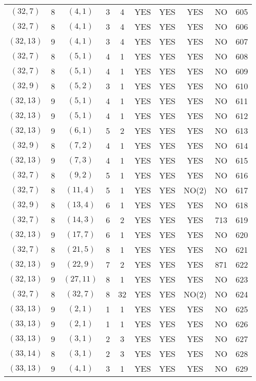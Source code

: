 \begin{longtable}{|c|c|c|c|c|c|c|c|c|c|}
$(32, 7)$ & 8 & $(4, 1)$ & 3 & 4 & YES & YES & YES & NO & 605\\
$(32, 7)$ & 8 & $(4, 1)$ & 3 & 4 & YES & YES & YES & NO & 606\\
$(32, 13)$ & 9 & $(4, 1)$ & 3 & 4 & YES & YES & YES & NO & 607\\
$(32, 7)$ & 8 & $(5, 1)$ & 4 & 1 & YES & YES & YES & NO & 608\\
$(32, 7)$ & 8 & $(5, 1)$ & 4 & 1 & YES & YES & YES & NO & 609\\
$(32, 9)$ & 8 & $(5, 2)$ & 3 & 1 & YES & YES & YES & NO & 610\\
$(32, 13)$ & 9 & $(5, 1)$ & 4 & 1 & YES & YES & YES & NO & 611\\
$(32, 13)$ & 9 & $(5, 1)$ & 4 & 1 & YES & YES & YES & NO & 612\\
$(32, 13)$ & 9 & $(6, 1)$ & 5 & 2 & YES & YES & YES & NO & 613\\
$(32, 9)$ & 8 & $(7, 2)$ & 4 & 1 & YES & YES & YES & NO & 614\\
$(32, 13)$ & 9 & $(7, 3)$ & 4 & 1 & YES & YES & YES & NO & 615\\
$(32, 7)$ & 8 & $(9, 2)$ & 5 & 1 & YES & YES & YES & NO & 616\\
$(32, 7)$ & 8 & $(11, 4)$ & 5 & 1 & YES & YES & NO(2) & NO & 617\\
$(32, 9)$ & 8 & $(13, 4)$ & 6 & 1 & YES & YES & YES & NO & 618\\
$(32, 7)$ & 8 & $(14, 3)$ & 6 & 2 & YES & YES & YES & 713 & 619\\
$(32, 13)$ & 9 & $(17, 7)$ & 6 & 1 & YES & YES & YES & NO & 620\\
$(32, 7)$ & 8 & $(21, 5)$ & 8 & 1 & YES & YES & YES & NO & 621\\
$(32, 13)$ & 9 & $(22, 9)$ & 7 & 2 & YES & YES & YES & 871 & 622\\
$(32, 13)$ & 9 & $(27, 11)$ & 8 & 1 & YES & YES & YES & NO & 623\\
$(32, 7)$ & 8 & $(32, 7)$ & 8 & 32 & YES & YES & NO(2) & NO & 624\\
$(33, 13)$ & 9 & $(2, 1)$ & 1 & 1 & YES & YES & YES & NO & 625\\
$(33, 13)$ & 9 & $(2, 1)$ & 1 & 1 & YES & YES & YES & NO & 626\\
$(33, 13)$ & 9 & $(3, 1)$ & 2 & 3 & YES & YES & YES & NO & 627\\
$(33, 14)$ & 8 & $(3, 1)$ & 2 & 3 & YES & YES & YES & NO & 628\\
$(33, 13)$ & 9 & $(4, 1)$ & 3 & 1 & YES & YES & YES & NO & 629\\

\end{longtable}

